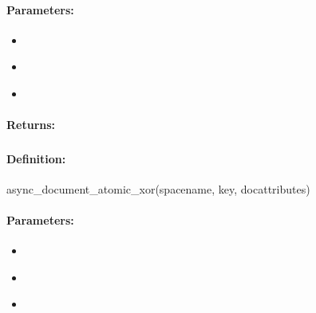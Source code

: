 \paragraph{Parameters:}
\begin{itemize}[noitemsep]
\item {}\\

\item {}\\

\item {}\\

\end{itemize}

\paragraph{Returns:}


\pagebreak
\subsubsection{}
\label{api:ruby:async_document_atomic_xor}


\paragraph{Definition:}
\begin{rubycode}
async_document_atomic_xor(spacename, key, docattributes)
\end{rubycode}

\paragraph{Parameters:}
\begin{itemize}[noitemsep]
\item {}\\

\item {}\\

\item {}\\

\end{itemize}

